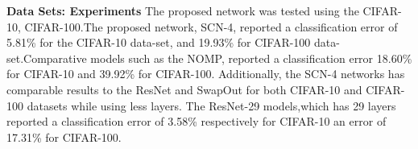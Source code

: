 \documentclass[10pt,twocolumn,letterpaper]{article}
\begin{document}
    
\noindent\textbf{Data Sets: Experiments }
The proposed network was tested using the CIFAR-10, CIFAR-100.The proposed network, SCN-4, reported a classification error of 5.81\% for the CIFAR-10 data-set, and 19.93\% for CIFAR-100 data-set.Comparative models such as the NOMP,  reported a classification error  18.60\% for  CIFAR-10 and 39.92\% for CIFAR-100. Additionally, the SCN-4 networks has comparable results to the ResNet and SwapOut for both CIFAR-10 and CIFAR-100 datasets while using less layers. The ResNet-29 models,which has 29 layers reported a classification error of 3.58\% respectively for CIFAR-10 an error of  17.31\% for CIFAR-100. 
\end{document}
